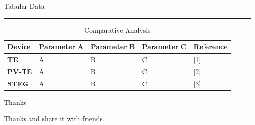 \documentclass{beamer}
\begin{document}
\begin{frame}{Tabular Data\\\rule{10.5cm}{0.5pt}} \label{summary}

\begin{table}[]
	\begin{tiny}
	\caption{Comparative Analysis}
	\label{Compare}
	\begin{tabular}{|l|l|l|l|l|}
		\hline
		\textbf{Device} & \textbf{Parameter A} & \textbf{Parameter B} & \textbf{Parameter C} & \textbf{Reference} \\ \hline
		\textbf{TE}     & A                    & B                    & C                    & {[}1{]}            \\ \hline
		\textbf{PV-TE}  & A                    & B                    & C                    & {[}2{]}            \\ \hline
		\textbf{STEG}   & A                    & B                    & C                    & {[}3{]}            \\ \hline
	\end{tabular}
\end{tiny}
\end{table}

\end{frame}

\begin{frame}{Thanks} \label{lastslide}
\begin{center}
Thanks and share it with friends.
\end{center}
\end{frame}
\end{document}
